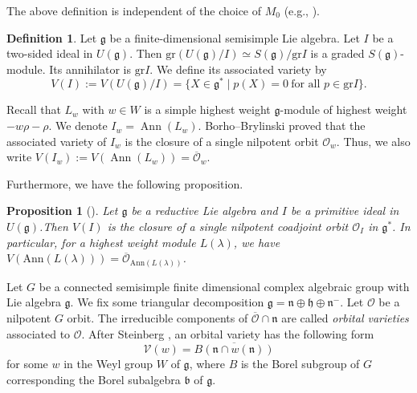 \documentclass[11pt, reqno]{amsart}
\newcommand{\Ann}{\operatorname{Ann}}
\newtheorem{prop}[Thm]{Proposition}
\theoremstyle{definition}
\newtheorem{dfn}[Thm]{Definition}
\numberwithin{equation}{section}
\begin{document}
The above  definition is independent of the choice of $M_0$ (e.g., \cite{NOT}). 

\begin{dfn} Let $\mathfrak{g}$ be a finite-dimensional semisimple Lie algebra. Let $I$ be a two-sided ideal in $U(\mathfrak{g})$. Then $\text{gr}(U(\mathfrak{g})/I)\simeq S(\mathfrak{g})/\text{gr}I$ is a graded $S(\mathfrak{g})$-module. Its annihilator is $\text{gr}I$. We define its associated variety by
	$$V(I):=V(U(\mathfrak{g})/I)=\{X\in \mathfrak{g}^* \mid p(X)=0\ \mbox{for all $p\in {\text{gr}}I$}\}.
	$$
\end{dfn}


Recall that  $L_w$ with $ w\in W$  is a simple highest weight $\mathfrak{g}$-module of highest weight $-w\rho-\rho$.  We denote $I_w=\Ann(L_w)$.  Borho--Brylinski \cite{BoB1} proved that the associated variety of  $I_w$ is  the closure of a single nilpotent orbit $\mathcal{O}_w$. Thus, we also write  $V(I_w):= V(\Ann (L_w))=\overline{\mathcal{O}}_w$.
	




 Furthermore, we have the following proposition.

\begin{prop}[\cite{Jo85}]
	Let $\mathfrak{g}$ be a reductive Lie algebra and $I$ be a primitive ideal in $U(\mathfrak{g})$.Then $V(I)$ is the closure of a single nilpotent coadjoint orbit $\mathcal{O}_I$ in $\mathfrak{g}^*$. In particular, for a highest weight module $L(\lambda)$, we have $V(\mathrm{Ann} (L(\lambda)))=\overline{\mathcal{O}}_{\mathrm{Ann}(L(\lambda))}$.
\end{prop}







Let $G$ be a connected semisimple finite dimensional complex algebraic group with Lie algebra $\mathfrak{g}$. We fix some triangular decomposition $\mathfrak{g}=\mathfrak{n }\oplus \mathfrak{h} \oplus \mathfrak{n}^{-}$. Let $\mathcal{O}$ be a nilpotent $G$ orbit. The   irreducible components of $\overline{\mathcal{O}}\cap \mathfrak{n}$  are called {\it orbital varieties} associated to $\mathcal{O}$.  {After Steinberg \cite{St76}}, an orbital variety has the following form
$$\mathcal{V}(w)=\overline{B(\mathfrak{n}\cap{w(\mathfrak{n})} )}$$ for some  $w$ in the Weyl group $ W$ of $\mathfrak{g}$, where $B$ is the Borel subgroup of $G$ corresponding the Borel subalgebra $\mathfrak{b}$ of $\mathfrak{g}$.
\end{document}
